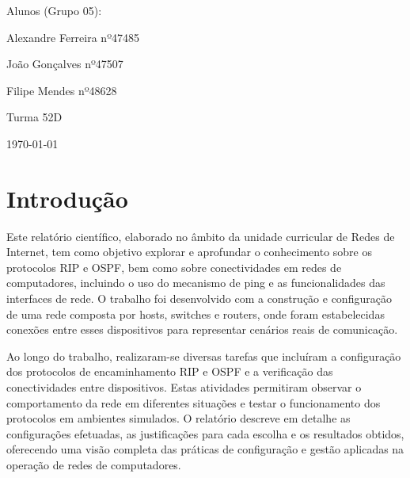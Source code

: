 \documentclass[11pt,english, openright, oneside]{book}
\begin{document}
\begin{titlepage}
\begin{center}
{        \vspace{0.5cm}
              
        Alunos (Grupo 05):
        \par
        Alexandre Ferreira nº47485 
        \par 
        João Gonçalves nº47507
        \par
        Filipe Mendes nº48628
        
        \vspace{0.5cm} 
        Turma 52D
                
        \vspace{1cm}
        {\normalsize \today \par}
	             
	             
	             
	             \par}
	\end{center}
		
	
	
	\pagebreak

\end{titlepage}

\tableofcontents
\pagebreak
\newpage


\begingroup
\let\clearpage\relax
\pagebreak
\listoffigures
\endgroup

\newpage

\begingroup
\let\clearpage\relax
\pagebreak
\listoftables
\endgroup

\newpage

\mainmatter
\chapter{Introdução}
Este relatório científico, elaborado no âmbito da unidade curricular de Redes de Internet, tem como objetivo explorar e aprofundar o conhecimento sobre os protocolos RIP e OSPF, bem como sobre conectividades em redes de computadores, incluindo o uso do mecanismo de ping e as funcionalidades das interfaces de rede. O trabalho foi desenvolvido com a construção e configuração de uma rede composta por hosts, switches e routers, onde foram estabelecidas conexões entre esses dispositivos para representar cenários reais de comunicação. \par \vspace{0.2cm}

Ao longo do trabalho, realizaram-se diversas tarefas que incluíram a configuração dos protocolos de encaminhamento RIP e OSPF e a verificação das conectividades entre dispositivos. Estas atividades permitiram observar o comportamento da rede em diferentes situações e testar o funcionamento dos protocolos em ambientes simulados. O relatório descreve em detalhe as configurações efetuadas, as justificações para cada escolha e os resultados obtidos, oferecendo uma visão completa das práticas de configuração e gestão aplicadas na operação de redes de computadores. \par \vspace{0.2cm}
\end{document}
